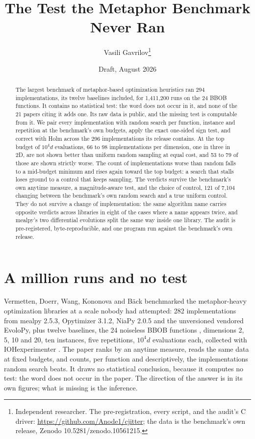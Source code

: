 \documentclass[11pt]{article}
\title{\textbf{The Test the Metaphor Benchmark Never Ran}}
\author{Vasili Gavrilov\thanks{Independent researcher. The pre-registration, every script,
and the audit's C driver: \url{https://github.com/Anode1/cjitter}; the data is the
benchmark's own release, Zenodo 10.5281/zenodo.10561215.}}
\date{Draft, August 2026}
\begin{document}
\maketitle

\begin{abstract}
The largest benchmark of metaphor-based optimization heuristics ran 294 implementations,
its twelve baselines included, for 1{,}411{,}200 runs on the 24 BBOB functions. It
contains no statistical test: the word does not occur in it, and none of the 21 papers
citing it adds one. Its raw data is public, and the missing test is
computable from it. We pair every implementation with random search per function,
instance and repetition at the benchmark's own budgets, apply the exact one-sided sign
test, and correct with Holm across the 296 implementations its release contains. At the
top budget of $10^4 d$ evaluations, 66 to 98 implementations per dimension, one in three
in 2D, are not shown better than uniform random sampling at equal cost, and 53 to 79 of
those are shown strictly worse. The count of implementations worse than random falls to a
mid-budget minimum and rises again toward the top budget: a search that stalls loses
ground to a control that keeps sampling. The verdicts survive the benchmark's own
anytime measure, a magnitude-aware test, and the choice of control, 121 of 7{,}104
changing between the benchmark's own random search and a true uniform control. They do
not survive a change of implementation: the same algorithm name carries opposite
verdicts across libraries in eight of the cases where a name appears twice, and mealpy's
two differential evolutions split the same way inside one library. The audit is pre-registered, byte-reproducible,
and one program run against the benchmark's own release.
\end{abstract}

\section{A million runs and no test}

Vermetten, Doerr, Wang, Kononova and B\"ack \cite{vermetten24} benchmarked the
metaphor-heavy optimization libraries at a scale nobody had attempted: 282
implementations from mealpy 2.5.3, Opytimizer 3.1.2, NiaPy 2.0.5 and the unversioned
vendored EvoloPy, plus twelve baselines, the 24 noiseless BBOB functions \cite{coco},
dimensions 2, 5, 10 and 20, ten instances, five repetitions, $10^4 d$ evaluations each,
collected with IOHexperimenter \cite{ioh}. The paper ranks by an anytime measure, reads
the same data at fixed budgets, and counts, per function and descriptively, the
implementations random search beats. It draws no statistical conclusion, because it
computes no test: the word does not occur in the paper. The direction of the answer is
in its own figures; what is missing is the inference.
\end{document}

